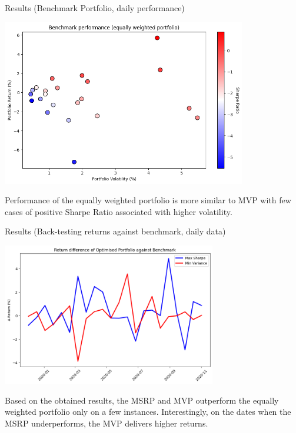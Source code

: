 \documentclass{beamer}
\begin{document}
\begin{frame}{Results (Benchmark Portfolio, daily performance)}
    \begin{center}
        \includegraphics[width=0.8\textwidth]{resources/Benchmark performance (equally weighted portfolio).png}
    \end{center}
Performance of the equally weighted portfolio is more similar to MVP with few cases of positive Sharpe Ratio associated with higher volatility.  
\end{frame}

\begin{frame}{Results (Back-testing returns against benchmark, daily data)}
    \begin{center}
        \includegraphics[width=0.7\textwidth]{resources/Return difference of Optimised Portfolio against Benchmark.png}
    \end{center}

\small {Based on the obtained results, the MSRP and MVP outperform the equally weighted portfolio only on a few instances. Interestingly, on the dates when the MSRP underperforms, the MVP delivers higher returns. }

\end{frame}
\end{document}
